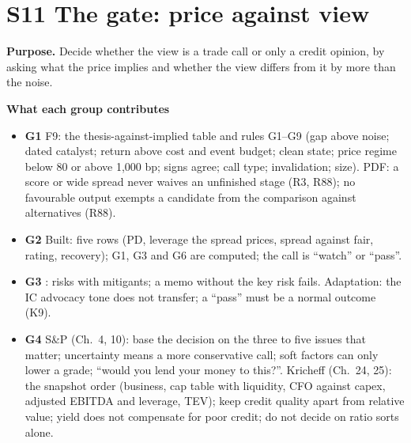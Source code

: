 \documentclass[11pt]{article}
\newcommand{\GA}{\textcolor{gA}{\textbf{G1}}}
\newcommand{\GB}{\textcolor{gB}{\textbf{G2}}}
\newcommand{\GC}{\textcolor{gC}{\textbf{G3}}}
\newcommand{\GD}{\textcolor{gD}{\textbf{G4}}}
\newcommand{\fld}[1]{\par\medskip\noindent\textbf{\textcolor{steel}{#1}}\par\nopagebreak}
\begin{document}
\section{S11 The gate: price against view}\label{s11}

\textbf{Purpose.} Decide whether the view is a trade call or only a credit opinion, by asking what the price implies and whether the view differs from it by more than the noise.

\fld{What each group contributes}
\begin{itemize}
\item \GA{} F9: the thesis-against-implied table and rules G1--G9 (gap above noise; dated catalyst; return above cost and event budget; clean state; price regime below 80 or above 1,000 bp; signs agree; call type; invalidation; size). PDF: a score or wide spread never waives an unfinished stage (R3, R88); no favourable output exempts a candidate from the comparison against alternatives (R88).
\item \GB{} Built: five rows (PD, leverage the spread prices, spread against fair, rating, recovery); G1, G3 and G6 are computed; the call is ``watch'' or ``pass''.
\item \GC{} : risks with mitigants; a memo without the key risk fails. Adaptation: the IC advocacy tone does not transfer; a ``pass'' must be a normal outcome (K9).
\item \GD{} S\&P (Ch.~4, 10): base the decision on the three to five issues that matter; uncertainty means a more conservative call; soft factors can only lower a grade; ``would you lend your money to this?''. Kricheff (Ch.~24, 25): the snapshot order (business, cap table with liquidity, CFO against capex, adjusted EBITDA and leverage, TEV); keep credit quality apart from relative value; yield does not compensate for poor credit; do not decide on ratio sorts alone.
\end{itemize}
\end{document}
